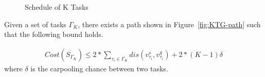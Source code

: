 \documentclass[sigconf,anonymous]{aamas}
\begin{document}
\begin{figure}[ht]
  \centering
  \caption{Schedule of K Tasks}
  \label{PKT}
\end{figure}

\begin{theorem}
    \label{thm:TaskGroupCost}
    Given a set of tasks $\Gamma_K$, there exists a path shown in Figure~\ref{fig:KTG-path} 
    such that the following bound holds.
    
    \begin{eqnarray}
        \label{eq:tgc}
        Cost(\dot{S_{\Gamma_K}}) \leq 2 {\ast} \sum_{\tau_i \in \Gamma_K}{dis(v^{s}_{\tau_i}, v^{g}_{\tau_i})} 
        + 2{\ast}(K-1)\delta
    \end{eqnarray}
    where $\delta$ is the carpooling chance between two tasks.
\end{theorem}
\end{document}
